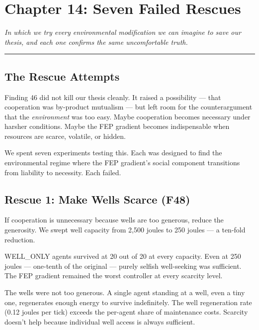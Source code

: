 \chapter{Chapter 14: Seven Failed Rescues}\label{chapter-14-seven-failed-rescues}

\emph{In which we try every environmental modification we can imagine to save our thesis, and each one confirms the same uncomfortable truth.}

\begin{center}\rule{0.5\linewidth}{0.5pt}\end{center}

\section{The Rescue Attempts}\label{the-rescue-attempts}

Finding 46 did not kill our thesis cleanly. It raised a possibility --- that cooperation was by-product mutualism --- but left room for the counterargument that the \emph{environment} was too easy. Maybe cooperation becomes necessary under harsher conditions. Maybe the FEP gradient becomes indispensable when resources are scarce, volatile, or hidden.

We spent seven experiments testing this. Each was designed to find the environmental regime where the FEP gradient's social component transitions from liability to necessity. Each failed.

\section{Rescue 1: Make Wells Scarce (F48)}\label{rescue-1-make-wells-scarce-f48}

If cooperation is unnecessary because wells are too generous, reduce the generosity. We swept well capacity from 2,500 joules to 250 joules --- a ten-fold reduction.

WELL\_ONLY agents survived at 20 out of 20 at every capacity. Even at 250 joules --- one-tenth of the original --- purely selfish well-seeking was sufficient. The FEP gradient remained the worst controller at every scarcity level.

The wells were not too generous. A single agent standing at a well, even a tiny one, regenerates enough energy to survive indefinitely. The well regeneration rate (0.12 joules per tick) exceeds the per-agent share of maintenance costs. Scarcity doesn't help because individual well access is always sufficient.

